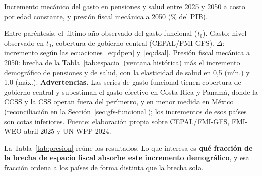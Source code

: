 \documentclass[12pt, letterpaper]{article}
\begin{document}
\begin{table}[htbp]
  \centering
  \caption{Incremento mecánico del gasto en pensiones y salud entre 2025 y 2050 a
  costo por edad constante, y presión fiscal mecánica a 2050 (\% del PIB).}
  \label{tab:presion}
  \small
  \begin{adjustbox}{max width=\textwidth}
  
  \end{adjustbox}

  \vspace{2pt}
  \footnotesize
  Entre paréntesis, el último año observado del gasto funcional ($t_0$). Gasto:
  nivel observado en $t_0$, cobertura de gobierno central (CEPAL/FMI-GFS).
  $\Delta$: incremento según las ecuaciones~\eqref{eq:dpen} y~\eqref{eq:dsal}.
  Presión fiscal mecánica a 2050: brecha de la Tabla~\ref{tab:espacio} (ventana histórica) más
  el incremento demográfico de pensiones y de salud, con la elasticidad de salud
  en 0,5 (mín.) y 1,0 (máx.). \textbf{Advertencias.} Las series de gasto funcional
  tienen cobertura de gobierno central y subestiman el gasto efectivo en Costa Rica
  y Panamá, donde la CCSS y la CSS operan fuera del perímetro, y en menor medida en
  México (reconciliación en la Sección~\ref{sec:gfs-funcional}); los incrementos de
  esos países son cotas inferiores.
  Fuente: elaboración propia sobre CEPAL/FMI-GFS, FMI-WEO abril 2025 y UN WPP 2024.
\end{table}

La Tabla~\ref{tab:presion} reúne los resultados. Lo que interesa es \textbf{qué
fracción de la brecha de espacio fiscal absorbe este incremento demográfico}, y esa
fracción ordena a los países de forma distinta que la brecha sola.
\end{document}
